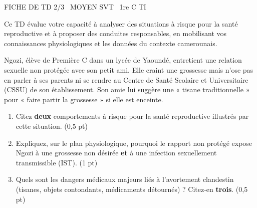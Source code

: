 \documentclass[11pt]{article}
\begin{document}
\begin{tcolorbox}[enhanced,colback=popink,colframe=popink,arc=10pt,boxrule=0pt,left=12pt,right=12pt,top=9pt,bottom=9pt]
{\color{white}\popxbold\small FICHE DE TD 2/3 \textbullet\ MOYEN \hfill SVT \textbullet\ 1re C TI\par}
\end{tcolorbox}
\vspace{4pt}
Ce TD évalue votre capacité à analyser des situations à risque pour la santé reproductive et à proposer des conduites responsables, en mobilisant vos connaissances physiologiques et les données du contexte camerounais.

\begin{exercice}
Ngozi, élève de Première C dans un lycée de Yaoundé, entretient une relation sexuelle non protégée avec son petit ami. Elle craint une grossesse mais n'ose pas en parler à ses parents ni se rendre au Centre de Santé Scolaire et Universitaire (CSSU) de son établissement. Son amie lui suggère une « tisane traditionnelle » pour « faire partir la grossesse » si elle est enceinte.
\begin{enumerate}
    \item Citez \textbf{deux} comportements à risque pour la santé reproductive illustrés par cette situation. (0,5 pt)
    \item Expliquez, sur le plan physiologique, pourquoi le rapport non protégé expose Ngozi à une grossesse non désirée \textbf{et} à une infection sexuellement transmissible (IST). (1 pt)
    \item Quels sont les dangers médicaux majeurs liés à l'avortement clandestin (tisanes, objets contondants, médicaments détournés) ? Citez-en \textbf{trois}. (0,5 pt)
\end{enumerate}
\end{exercice}
\end{document}
